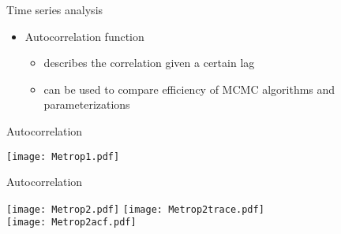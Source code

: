 \documentclass[finnish,english,t]{beamer}
\begin{document}


    


\begin{frame}{Time series analysis}

  \begin{itemize}
  \item Autocorrelation function
    \begin{itemize}
    \item describes the correlation given a certain lag
    \item can be used to compare efficiency of MCMC algorithms and parameterizations
    \end{itemize}
  \end{itemize}
\end{frame}

\begin{frame}{Autocorrelation}

  \vspace{-0.5\baselineskip}
  \texttt{[image: Metrop1.pdf]}
  
\end{frame}

\begin{frame}{Autocorrelation}

  \vspace{-0.5\baselineskip}
  \texttt{[image: Metrop2.pdf]}
  {\texttt{[image: Metrop2trace.pdf]}\\}
  {\texttt{[image: Metrop2acf.pdf]}}
  
\end{frame}
\end{document}
